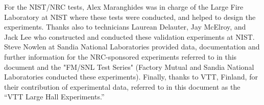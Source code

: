 \documentclass[12pt]{book}
\begin{document}
For the NIST/NRC tests, Alex Maranghides was in charge of the Large Fire Laboratory at NIST where these tests were conducted, and helped to design the experiments. Thanks also to technicians Laurean Delauter, Jay McElroy, and Jack Lee who constructed and conducted these validation experiments at NIST. Steve Nowlen at Sandia National Laboratories provided data, documentation and further information for the NRC-sponsored experiments referred to in this document and the "FM/SNL Test Series" (Factory Mutual and Sandia National Laboratories conducted these experiments). Finally, thanks to VTT, Finland, for their contribution of experimental data, referred to in this document as the ``VTT Large Hall Experiments.''

\tableofcontents

\listoffigures

\listoftables

\mainmatter








%









\appendix
{}




\end{document}
